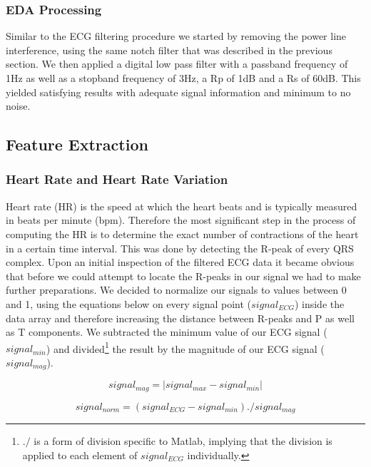 \newpage
\subsubsection{EDA Processing}
Similar to the ECG filtering procedure we started by removing the power line interference, using the same notch filter that was described in the previous section. We then applied a digital low pass filter with a passband frequency of 1Hz as well as a stopband frequency of 3Hz, a Rp of 1dB and a Rs of 60dB. This yielded satisfying results with adequate signal information and minimum to no noise. 

\subsection{Feature Extraction}
\subsubsection{Heart Rate and Heart Rate Variation}\label{HRHRV}
Heart rate (HR) is the speed at which the heart beats and is typically measured in beats per minute (bpm). Therefore the most significant step in the process of computing the HR is to determine the exact number of contractions of the heart in a certain time interval. This was done by detecting the R-peak of every QRS complex. Upon an initial inspection of the filtered ECG data it became obvious that before we could attempt to locate the R-peaks in our signal we had to make further preparations. 
We decided to normalize our signals to values between 0 and 1, using the equations below on every signal point ($signal_{ECG}$) inside the data array and therefore increasing the distance between R-peaks and P as well as T components. We subtracted the minimum value of our ECG signal ($signal_{min}$) and divided\footnote{$./$ is a form of division specific to Matlab, implying that the division is applied to each element of $signal_{ECG}$ individually.} the result by the magnitude of our ECG signal ($signal_{mag}$). 

\begin{equation}
signal_{mag} = |signal_{max} - signal_{min}|
\end{equation}

\begin{equation}
signal_{norm} = (signal_{ECG} - signal_{min})./signal_{mag}
\end{equation}

